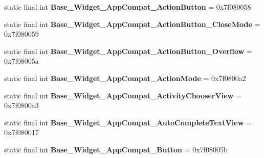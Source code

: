 \begin{DoxyCompactItemize}
\item 
\hypertarget{classandroid_1_1support_1_1v7_1_1appcompat_1_1_r_1_1style_acbbde3a0af3ff2fec800b3cf26b6cb43}{}static final int {\bfseries Base\+\_\+\+Widget\+\_\+\+App\+Compat\+\_\+\+Action\+Button} = 0x7f080058\label{classandroid_1_1support_1_1v7_1_1appcompat_1_1_r_1_1style_acbbde3a0af3ff2fec800b3cf26b6cb43}

\item 
\hypertarget{classandroid_1_1support_1_1v7_1_1appcompat_1_1_r_1_1style_a92cb61a7ba81c923c135814c99b115ec}{}static final int {\bfseries Base\+\_\+\+Widget\+\_\+\+App\+Compat\+\_\+\+Action\+Button\+\_\+\+Close\+Mode} = 0x7f080059\label{classandroid_1_1support_1_1v7_1_1appcompat_1_1_r_1_1style_a92cb61a7ba81c923c135814c99b115ec}

\item 
\hypertarget{classandroid_1_1support_1_1v7_1_1appcompat_1_1_r_1_1style_ac6f65da34073ebe5e8c6d51f5d952d38}{}static final int {\bfseries Base\+\_\+\+Widget\+\_\+\+App\+Compat\+\_\+\+Action\+Button\+\_\+\+Overflow} = 0x7f08005a\label{classandroid_1_1support_1_1v7_1_1appcompat_1_1_r_1_1style_ac6f65da34073ebe5e8c6d51f5d952d38}

\item 
\hypertarget{classandroid_1_1support_1_1v7_1_1appcompat_1_1_r_1_1style_a714062b6eda38c04eaa0ecc46419e4de}{}static final int {\bfseries Base\+\_\+\+Widget\+\_\+\+App\+Compat\+\_\+\+Action\+Mode} = 0x7f0800a2\label{classandroid_1_1support_1_1v7_1_1appcompat_1_1_r_1_1style_a714062b6eda38c04eaa0ecc46419e4de}

\item 
\hypertarget{classandroid_1_1support_1_1v7_1_1appcompat_1_1_r_1_1style_a763df5f9b4377366ab96cdddb07b074b}{}static final int {\bfseries Base\+\_\+\+Widget\+\_\+\+App\+Compat\+\_\+\+Activity\+Chooser\+View} = 0x7f0800a3\label{classandroid_1_1support_1_1v7_1_1appcompat_1_1_r_1_1style_a763df5f9b4377366ab96cdddb07b074b}

\item 
\hypertarget{classandroid_1_1support_1_1v7_1_1appcompat_1_1_r_1_1style_aba92e3e484b4dac3d7519aaf47a1a941}{}static final int {\bfseries Base\+\_\+\+Widget\+\_\+\+App\+Compat\+\_\+\+Auto\+Complete\+Text\+View} = 0x7f080017\label{classandroid_1_1support_1_1v7_1_1appcompat_1_1_r_1_1style_aba92e3e484b4dac3d7519aaf47a1a941}

\item 
\hypertarget{classandroid_1_1support_1_1v7_1_1appcompat_1_1_r_1_1style_a44c66034ef099053a9495dc74b620071}{}static final int {\bfseries Base\+\_\+\+Widget\+\_\+\+App\+Compat\+\_\+\+Button} = 0x7f08005b\label{classandroid_1_1support_1_1v7_1_1appcompat_1_1_r_1_1style_a44c66034ef099053a9495dc74b620071}


\end{DoxyCompactItemize}
